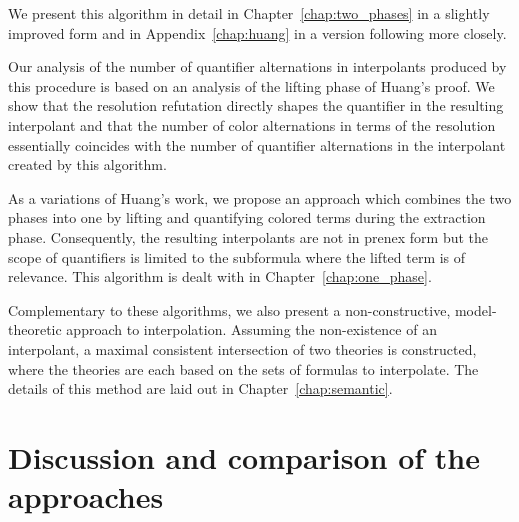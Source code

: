 We present this algorithm in detail in Chapter~\ref{chap:two_phases} in a slightly improved form and in Appendix~\ref{chap:huang} in a version following \cite{Huang95} more closely. 


Our analysis of the number of quantifier alternations in interpolants produced by this procedure is based on an analysis of the lifting phase of Huang's proof.
We show that the resolution refutation directly shapes the quantifier in the resulting interpolant 
and that the number of color alternations in terms of the resolution essentially coincides with the number of quantifier alternations in the interpolant created by this algorithm.





As a variations of Huang's work, we propose an approach which combines the two phases into one 
by lifting and quantifying colored terms during the extraction phase. 
Consequently, the resulting interpolants are not in prenex form but the scope of quantifiers is limited to the subformula where the lifted term is of relevance.
This algorithm is dealt with in Chapter~\ref{chap:one_phase}.

Complementary to these algorithms, we also present a non-constructive, model-theoretic approach to interpolation.
Assuming the non-existence of an interpolant, a maximal consistent intersection of two theories is constructed, where the theories are each based on the sets of formulas to interpolate. The details of this method are laid out in Chapter~\ref{chap:semantic}.


\section{Discussion and comparison of the approaches}

